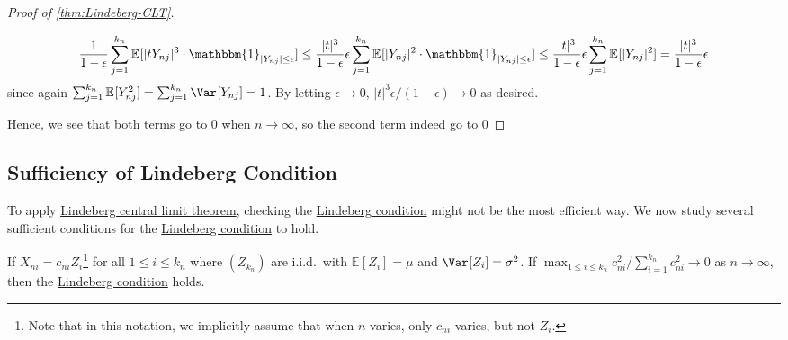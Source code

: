 \begin{proof}[Proof of \autoref{thm:Lindeberg-CLT}]
\begin{itemize}
		      \[
			      \frac{1}{1 - \epsilon } \sum_{j=1}^{k_n} \mathbb{E}_{}[\vert t Y_{nj} \vert ^3 \cdot \mathbbm{1}_{\vert Y_{nj} \vert \leq \epsilon } ]
			      \leq \frac{\vert t \vert ^3}{1 - \epsilon } \epsilon \sum_{j=1}^{k_n} \mathbb{E}_{}[\vert Y_{nj} \vert ^2 \cdot \mathbbm{1}_{\vert Y_{nj} \vert \leq \epsilon } ]
			      \leq \frac{\vert t \vert ^3}{1 - \epsilon } \epsilon \sum_{j=1}^{k_n} \mathbb{E}_{}[\vert Y_{nj} \vert ^2 ]
			      = \frac{\vert t \vert ^3}{1 - \epsilon } \epsilon
		      \]
		      since again \(\sum_{j=1}^{k_n} \mathbb{E}_{}[Y_{nj}^2] = \sum_{j=1}^{k_n} \Var_{}[Y_{nj}] = 1\). By letting \(\epsilon \to 0\), \(\vert t \vert ^3 \epsilon / (1 - \epsilon ) \to 0\) as desired.
	\end{itemize}
	Hence, we see that both terms go to \(0\) when \(n \to \infty \), so the second term indeed go to \(0\)
\end{proof}

\subsection{Sufficiency of Lindeberg Condition}
To apply \hyperref[thm:Lindeberg-CLT]{Lindeberg central limit theorem}, checking the \hyperref[def:Lindeberg-condition]{Lindeberg condition} might not be the most efficient way. We now study several sufficient conditions for the \hyperref[def:Lindeberg-condition]{Lindeberg condition} to hold.

\begin{corollary}\label{thm:Hajek-Sidak-CLT}
	If \(X_{ni} = c_{ni} Z_i\)\footnote{Note that in this notation, we implicitly assume that when \(n\) varies, only \(c_{ni}\) varies, but not \(Z_i\).} for all \(1 \leq i \leq k_n\) where \((Z_{k_n})\) are i.i.d.\ with \(\mathbb{E}_{}[Z_i] = \mu \) and \(\Var_{}[Z_i] = \sigma ^2\). If \(\max _{1 \leq i \leq k_n} c_{ni}^2 / \sum_{i=1}^{k_n} c_{ni}^2 \to 0\) as \(n \to \infty \), then the \hyperref[def:Lindeberg-condition]{Lindeberg condition} holds.
\end{corollary}